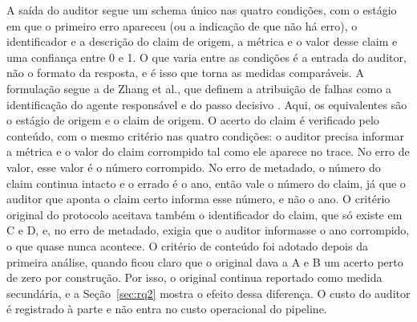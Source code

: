 A saída do auditor segue um schema único nas quatro condições, com o estágio em que o primeiro erro apareceu (ou a indicação de que não há erro), o identificador e a descrição do claim de origem, a métrica e o valor desse claim e uma confiança entre 0 e 1.
O que varia entre as condições é a entrada do auditor, não o formato da resposta, e é isso que torna as medidas comparáveis.
A formulação segue a de Zhang et al., que definem a atribuição de falhas como a identificação do agente responsável e do passo decisivo \cite{zhang2025which}. Aqui, os equivalentes são o estágio de origem e o claim de origem.
O acerto do claim é verificado pelo conteúdo, com o mesmo critério nas quatro condições: o auditor precisa informar a métrica e o valor do claim corrompido tal como ele aparece no trace.
No erro de valor, esse valor é o número corrompido. No erro de metadado, o número do claim continua intacto e o errado é o ano, então vale o número do claim, já que o auditor que aponta o claim certo informa esse número, e não o ano.
O critério original do protocolo aceitava também o identificador do claim, que só existe em C e D, e, no erro de metadado, exigia que o auditor informasse o ano corrompido, o que quase nunca acontece.
O critério de conteúdo foi adotado depois da primeira análise, quando ficou claro que o original dava a A e B um acerto perto de zero por construção. Por isso, o original continua reportado como medida secundária, e a Seção~\ref{sec:rq2} mostra o efeito dessa diferença.
O custo do auditor é registrado à parte e não entra no custo operacional do pipeline.
